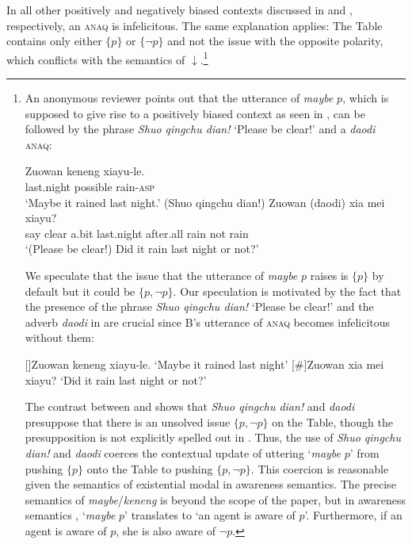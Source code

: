 \documentclass[output=paper,colorlinks,citecolor=brown]{langscibook}
\begin{document}
In all other positively and negatively biased contexts discussed in  and , respectively, an \textsc{anaq} is infelicitous. The same explanation applies:  The Table contains only either $\{p\}$ or $\{\neg p\}$ and not the issue with the opposite polarity, which conflicts with the semantics of $\downarrow$.\footnote{An anonymous reviewer points out that the utterance of \emph{maybe} $p$, which is supposed to give rise to a positively biased context as seen in , can be followed by  the phrase \emph{Shuo qingchu dian!}  `Please be clear!' and a \emph{daodi} \textsc{anaq}:


\ea\label{clear}
\begin{xlist}
  \gll Zuowan keneng xiayu-le.\\
 last.night possible rain-\textsc{asp}\\
 \glt `Maybe it rained last night.'
 \gll (Shuo qingchu dian!) Zuowan (daodi) xia mei xiayu?\\
 say clear a.bit last.night after.all rain not rain\\
\glt `(Please be clear!) Did it rain last night or not?'
\end{xlist}
\z


We speculate that the issue that the utterance of \emph{maybe} $p$ raises is $\{p\}$ by default but it could be  $\{p,  \neg p\}$.  Our speculation is motivated by the fact that the presence of the phrase \emph{Shuo qingchu dian!}  `Please be clear!' and the adverb \emph{daodi} in  are crucial since B's utterance of \textsc{anaq}  becomes infelicitous without them:

\ea\label{clear2}
\begin{xlist}
[]{Zuowan keneng xiayu-le.
\glt `Maybe it rained last night'}
 [\#]{Zuowan xia mei xiayu?
\glt `Did it rain last night or not?'}
\end{xlist}
\z


The contrast between  and  shows that \emph{Shuo qingchu dian!} and \emph{daodi} presuppose that there is an unsolved issue $\{p, \neg p\}$ on the Table, though the presupposition is not explicitly spelled out in .   Thus, the use of  \emph{Shuo qingchu dian!} and \emph{daodi} coerces the contextual update of uttering `\emph{maybe} $p$' from pushing $\{p\}$ onto the Table to pushing   $\{p, \neg p\}$.  This coercion is reasonable given the semantics of existential modal in awareness semantics.   The precise semantics of \emph{maybe}/\emph{keneng} is beyond the scope of the paper, but in awareness semantics \citep{Crone2018,BledinRawlins}, `\emph{maybe} $p$' translates to `an agent is aware of $p$'.  Furthermore, if an agent is aware of  $p$, she is also aware of $\neg p$.}
\end{document}
